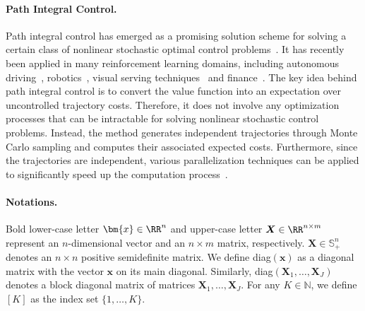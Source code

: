 \paragraph{Path Integral Control.}
Path integral control has emerged as a promising solution scheme for solving a certain class of nonlinear stochastic optimal control problems~\citep{kappen2005path}. It has recently been applied in many reinforcement learning domains, including autonomous driving~\citep{mohamed2022autonomous,williams2016aggressive,gandhi2021robust,ha2019topology}, robotics~\citep{theodorou2010generalized,chebotar2017path,williams2017information,yin2023risk,park2024distributionally,patil2022chance}, visual serving techniques~\citep{mohamed2021sampling,costanzo2023modeling,mohamed2021mppi} and finance~\citep{ingber2000high,decamps2006path,perkowski2016pathwise}. The key idea behind path integral control is to convert the value function into an expectation over uncontrolled trajectory costs. Therefore, it does not involve any optimization processes that can be intractable for solving nonlinear stochastic control problems. Instead, the method generates independent trajectories through Monte Carlo sampling and computes their associated expected costs. Furthermore, since the trajectories are independent, various parallelization techniques can be applied to significantly speed up the computation process~\citep{williams2017model}.

\paragraph{Notations.} 
Bold lower-case letter $\bm{x}\in\RR^n$ and upper-case letter $\boldsymbol{X}\in\RR^{n\times m}$ represent an $n$-dimensional vector and an $n\times m$ matrix, respectively.
$\bm{X}\in\mathbb{S}^n_{+}$ denotes an $n\times n$ positive semidefinite matrix. We define diag$(\bm{x})$ as a diagonal matrix with the vector $\bm{x}$ on its main diagonal. Similarly, diag$(\bm{X}_1,\ldots,\bm{X}_J)$ denotes a block diagonal matrix of matrices $\bm{X}_1,\ldots,\bm{X}_J$. For any $K \in \mathbb N$, we define $[K]$ as the index set $\{1,\dots,K\}$.